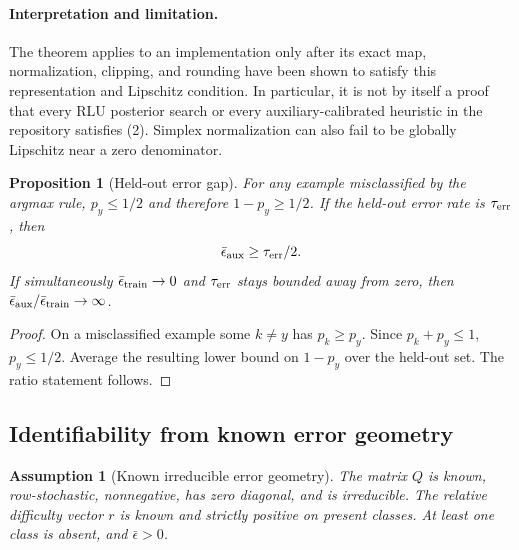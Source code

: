\documentclass[11pt]{article}
\newtheorem{assumption}{Assumption}
\newtheorem{proposition}{Proposition}
\begin{document}
\paragraph{Interpretation and limitation.} The theorem applies to an
implementation only after its exact map, normalization, clipping, and
rounding have been shown to satisfy this representation and Lipschitz
condition. In particular, it is not by itself a proof that every RLU posterior
search or every auxiliary-calibrated heuristic in the repository satisfies
(2). Simplex normalization can also fail to be globally Lipschitz near a
zero denominator.

\begin{proposition}[Held-out error gap]
\label{prop:heldout-gap}
For any example misclassified by the argmax rule, $p_y\le1/2$ and therefore
$1-p_y\ge1/2$. If the held-out error rate is $\tau_{\rm err}$, then
\[
 \bar\epsilon_{\rm aux}\ge\tau_{\rm err}/2.
\]
If simultaneously $\bar\epsilon_{\rm train}\to0$ and
$\tau_{\rm err}$ stays bounded away from zero, then
$\bar\epsilon_{\rm aux}/\bar\epsilon_{\rm train}\to\infty$.
\end{proposition}
\begin{proof}
On a misclassified example some $k\ne y$ has $p_k\ge p_y$. Since
$p_k+p_y\le1$, $p_y\le1/2$. Average the resulting lower bound on
$1-p_y$ over the held-out set. The ratio statement follows.
\end{proof}

\subsection{Identifiability from known error geometry}
\begin{assumption}[Known irreducible error geometry]
\label{ass:geometry}
The matrix $Q$ is known, row-stochastic, nonnegative, has zero diagonal, and
is irreducible. The relative difficulty vector $r$ is known and strictly
positive on present classes. At least one class is absent, and $\bar\epsilon>0$.
\end{assumption}
\end{document}
